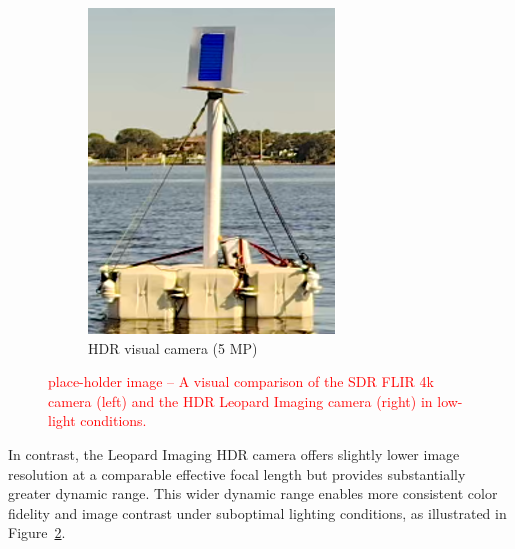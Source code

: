 \documentclass[../main.tex]{subfiles}
\begin{document}
\begin{figure}[htbp]
{\begin{subfigure}[t]{0.378\textwidth}
        \includegraphics[width=\textwidth]{Images/HDR_bright.png}
        \caption{HDR visual camera (5 MP)}
        \label{fig:HDR_bright}
    \end{subfigure}%
}
\caption{\textcolor{red}{place-holder image – A visual comparison of the \ac{SDR} FLIR 4k camera (left) and the \ac{HDR} Leopard Imaging camera (right) in low-light conditions.}}
\label{fig:HDR_compare}
\end{figure}

In contrast, the Leopard Imaging \ac{HDR} camera offers slightly lower image resolution at a comparable effective focal length but provides substantially greater dynamic range.
This wider dynamic range enables more consistent color fidelity and image contrast under suboptimal lighting conditions, as illustrated in Figure~\ref{fig:HDR_compare}.
\end{document}
